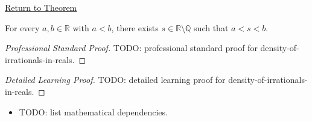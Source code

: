 \newpage
{}
\label{prf:density-of-irrationals-in-reals}

\begin{remark*}[Return]
\hyperref[thm:density-of-irrationals-in-reals]{Return to Theorem}
\end{remark*}

\begin{theorem*}
For every $a,b\in\mathbb{R}$ with $a<b$, there exists $s\in\mathbb{R}\setminus\mathbb{Q}$ such that $a<s<b$.
\end{theorem*}

\begin{proof}[Professional Standard Proof]
\LRAProofBodyStart
TODO: professional standard proof for density-of-irrationals-in-reals.
\end{proof}

\begin{proof}[Detailed Learning Proof]
\LRAProofBodyStart
TODO: detailed learning proof for density-of-irrationals-in-reals.
\end{proof}

\begin{remark*}
\end{remark*}

\begin{dependencies}
\begin{itemize}
  \item TODO: list mathematical dependencies.
\end{itemize}
\end{dependencies}

\clearpage

